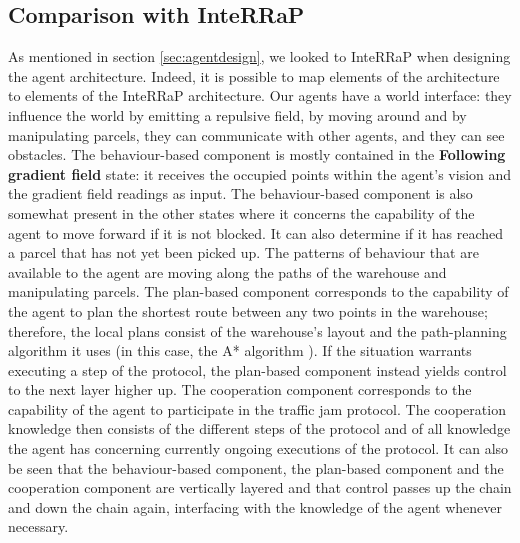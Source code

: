 \subsection{Comparison with InteRRaP}
As mentioned in section \ref{sec:agentdesign}, we looked to InteRRaP \cite{muller2011agent} when designing the agent architecture. Indeed, it is possible to map elements of the architecture to elements of the InteRRaP architecture. Our agents have a world interface: they influence the world by emitting a repulsive field, by moving around and by manipulating parcels, they can communicate with other agents, and they can see obstacles. The behaviour-based component is mostly contained in the \textbf{Following gradient field} state: it receives the occupied points within the agent's vision and the gradient field readings as input. The behaviour-based component is also somewhat present in the other states where it concerns the capability of the agent to move forward if it is not blocked. It can also determine if it has reached a parcel that has not yet been picked up. The patterns of behaviour that are available to the agent are moving along the paths of the warehouse and manipulating parcels. The plan-based component corresponds to the capability of the agent to plan the shortest route between any two points in the warehouse; therefore, the local plans consist of the warehouse's layout and the path-planning algorithm it uses (in this case, the A* algorithm \cite{wiki:astar}). If the situation warrants executing a step of the protocol, the plan-based component instead yields control to the next layer higher up. The cooperation component corresponds to the capability of the agent to participate in the traffic jam protocol. The cooperation knowledge then consists of the different steps of the protocol and of all knowledge the agent has concerning currently ongoing executions of the protocol. It can also be seen that the behaviour-based component, the plan-based component and the cooperation component are vertically layered and that control passes up the chain and down the chain again, interfacing with the knowledge of the agent whenever necessary.